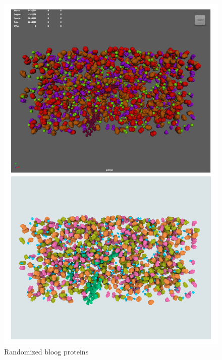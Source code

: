 \documentclass[
  digital, %
  table,   %
  nolof,     %
  nolot,     %
  oneside,
]{fithesis3}
\begin{document}
\begin{figure}
  \centering
  \includegraphics[scale=0.4]{images/demonstration/blood-big.png}
  \caption{Randomized bloog proteins}
  \label{fig:blood-random}
\end{figure}
\end{document}
